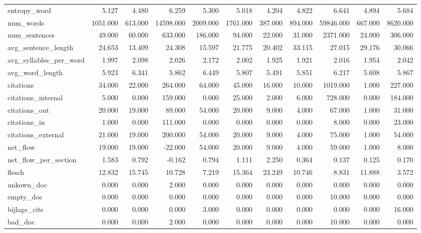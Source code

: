 \begin{tabular}{lrrrrrrrrrr}
\cline{1-11}
entropy\_word & 5.127 & 4.480 & 6.259 & 5.300 & 5.018 & 4.204 & 4.822 & 6.641 & 4.894 & 5.684 \\
\cline{1-11}
num\_words & 1051.000 & 613.000 & 14598.000 & 2009.000 & 1761.000 & 387.000 & 894.000 & 59846.000 & 667.000 & 8620.000 \\
\cline{1-11}
num\_sentences & 49.000 & 60.000 & 633.000 & 186.000 & 94.000 & 22.000 & 31.000 & 2371.000 & 24.000 & 306.000 \\
\cline{1-11}
avg\_sentence\_length & 24.653 & 13.409 & 24.308 & 15.597 & 21.775 & 20.402 & 33.115 & 27.015 & 29.176 & 30.066 \\
\cline{1-11}
avg\_syllables\_per\_word & 1.997 & 2.098 & 2.026 & 2.172 & 2.002 & 1.925 & 1.921 & 2.016 & 1.954 & 2.042 \\
\cline{1-11}
avg\_word\_length & 5.923 & 6.341 & 5.862 & 6.449 & 5.807 & 5.491 & 5.851 & 6.217 & 5.608 & 5.867 \\
\cline{1-11}
citations & 34.000 & 22.000 & 264.000 & 64.000 & 45.000 & 16.000 & 10.000 & 1019.000 & 1.000 & 227.000 \\
\cline{1-11}
citations\_internal & 5.000 & 0.000 & 159.000 & 0.000 & 25.000 & 2.000 & 6.000 & 728.000 & 0.000 & 184.000 \\
\cline{1-11}
citations\_out & 20.000 & 19.000 & 89.000 & 54.000 & 20.000 & 9.000 & 4.000 & 67.000 & 1.000 & 31.000 \\
\cline{1-11}
citations\_in & 1.000 & 0.000 & 111.000 & 0.000 & 0.000 & 0.000 & 0.000 & 8.000 & 0.000 & 23.000 \\
\cline{1-11}
citations\_external & 21.000 & 19.000 & 200.000 & 54.000 & 20.000 & 9.000 & 4.000 & 75.000 & 1.000 & 54.000 \\
\cline{1-11}
net\_flow & 19.000 & 19.000 & -22.000 & 54.000 & 20.000 & 9.000 & 4.000 & 59.000 & 1.000 & 8.000 \\
\cline{1-11}
net\_flow\_per\_section & 1.583 & 0.792 & -0.162 & 0.794 & 1.111 & 2.250 & 0.364 & 0.137 & 0.125 & 0.170 \\
\cline{1-11}
flesch & 12.832 & 15.745 & 10.728 & 7.219 & 15.364 & 23.249 & 10.746 & 8.831 & 11.888 & 3.572 \\
\cline{1-11}
unkown\_doc & 0.000 & 0.000 & 2.000 & 0.000 & 0.000 & 0.000 & 0.000 & 0.000 & 0.000 & 0.000 \\
\cline{1-11}
empty\_doc & 0.000 & 0.000 & 0.000 & 0.000 & 0.000 & 0.000 & 0.000 & 10.000 & 0.000 & 0.000 \\
\cline{1-11}
bijlage\_cits & 0.000 & 0.000 & 0.000 & 3.000 & 0.000 & 0.000 & 0.000 & 0.000 & 0.000 & 16.000 \\
\cline{1-11}
bad\_doc & 0.000 & 0.000 & 2.000 & 0.000 & 0.000 & 0.000 & 0.000 & 10.000 & 0.000 & 0.000 \\
\cline{1-11}
\bottomrule
\end{tabular}
